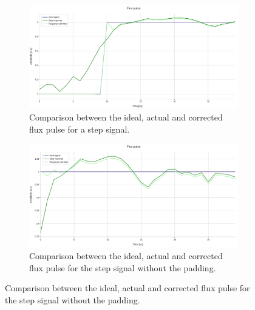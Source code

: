 \begin{figure}[h!]
    \centering
    \begin{subfigure}[t]{0.65\textwidth}
        \includegraphics[width=\textwidth]{figures/png/Cryoscope/filters/step_inverse.png}
        \caption{Comparison between the ideal, actual and corrected flux pulse for a step signal.}
        \label{fig:inverse:step}
    \end{subfigure}

    \vspace{0.5cm}

    \begin{subfigure}[t]{0.65\textwidth}
        \includegraphics[width=\textwidth]{figures/png/Cryoscope/filters/inverse_no_pad.png}
        \caption{Comparison between the ideal, actual and corrected flux pulse for the step signal without the padding.}
        \label{fig:inverse:no_pad}
    \end{subfigure}


\end{figure}
